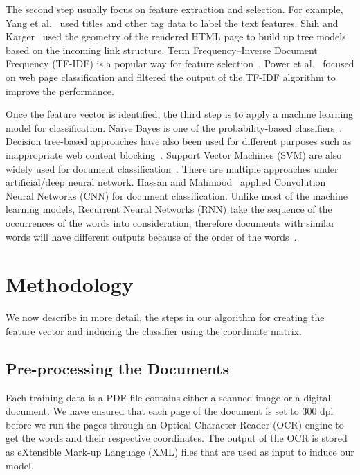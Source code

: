 \documentclass[runningheads]{llncs}
\begin{document}
The second step usually focus on feature extraction and selection. For example, Yang et al.~\cite{yang2002} used titles and other tag data to label the text features. Shih and Karger~\cite{shih2004} used the geometry of the rendered HTML page to build up tree models based on the incoming link structure. Term Frequency–Inverse Document Frequency (TF-IDF) is a popular way for feature selection~\cite{jones1972}. Power et al.~\cite{power2010} focused on web page classification and filtered the output of the TF-IDF algorithm to improve the performance.

Once the feature vector is identified, the third step is to apply a machine learning model for classification. Na\"ive Bayes is one of the probability-based classifiers~\cite{kotenko2015}. Decision tree-based approaches have also been used for different purposes such as inappropriate web content blocking~\cite{liu2017}. Support Vector Machines (SVM) are also widely used for document classification~\cite{farhoodi2010,lin2006}. There are multiple approaches under artificial/deep neural network. Hassan and Mahmood~\cite{hassan2017} applied Convolution Neural Networks (CNN) for document classification. Unlike most of the machine learning models, Recurrent Neural Networks (RNN) take the sequence of the occurrences of the words into consideration, therefore documents with similar words will have different outputs because of the order of the words~\cite{banerjee2019,kumar2019}.

\section{Methodology}\label{algo}
We now describe in more detail, the steps in our algorithm for creating the feature vector and inducing the classifier using the coordinate matrix.

\subsection{Pre-processing the Documents}
Each training data is a PDF file contains either a scanned image or a digital document. We have ensured that each page of the document is set to 300 dpi before we run the pages through an Optical Character Reader (OCR) engine to get the words and their respective coordinates. The output of the OCR is stored as eXtensible Mark-up Language (XML) files that are used as input to induce our model.
\end{document}
